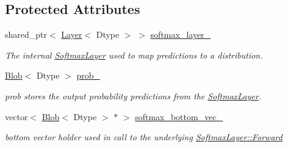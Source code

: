 \subsection*{Protected Attributes}
\begin{DoxyCompactItemize}
\item 
\mbox{\label{classcaffe_1_1_infogain_loss_layer_a4d15d74b6f3e109ad1fef2fdc8b2746d}} 
shared\+\_\+ptr$<$ \mbox{\hyperlink{classcaffe_1_1_layer}{Layer}}$<$ Dtype $>$ $>$ \mbox{\hyperlink{classcaffe_1_1_infogain_loss_layer_a4d15d74b6f3e109ad1fef2fdc8b2746d}{softmax\+\_\+layer\+\_\+}}
\begin{DoxyCompactList}\small\item\em The internal \mbox{\hyperlink{classcaffe_1_1_softmax_layer}{Softmax\+Layer}} used to map predictions to a distribution. \end{DoxyCompactList}\item 
\mbox{\label{classcaffe_1_1_infogain_loss_layer_aca1a18ac9d1bfa669d366d7ded927503}} 
\mbox{\hyperlink{classcaffe_1_1_blob}{Blob}}$<$ Dtype $>$ \mbox{\hyperlink{classcaffe_1_1_infogain_loss_layer_aca1a18ac9d1bfa669d366d7ded927503}{prob\+\_\+}}
\begin{DoxyCompactList}\small\item\em prob stores the output probability predictions from the \mbox{\hyperlink{classcaffe_1_1_softmax_layer}{Softmax\+Layer}}. \end{DoxyCompactList}\item 
\mbox{\label{classcaffe_1_1_infogain_loss_layer_a7122d05d7ea094afece0bbbf0addec33}} 
vector$<$ \mbox{\hyperlink{classcaffe_1_1_blob}{Blob}}$<$ Dtype $>$ $\ast$ $>$ \mbox{\hyperlink{classcaffe_1_1_infogain_loss_layer_a7122d05d7ea094afece0bbbf0addec33}{softmax\+\_\+bottom\+\_\+vec\+\_\+}}
\begin{DoxyCompactList}\small\item\em bottom vector holder used in call to the underlying \mbox{\hyperlink{classcaffe_1_1_layer_ab57d272dabe8c709d2a785eebe72ca57}{Softmax\+Layer\+::\+Forward}} \end{DoxyCompactList}\item 
\mbox{\label{classcaffe_1_1_infogain_loss_layer_aaad8260753f21cdd54631870128297ad}} 

\end{DoxyCompactItemize}
